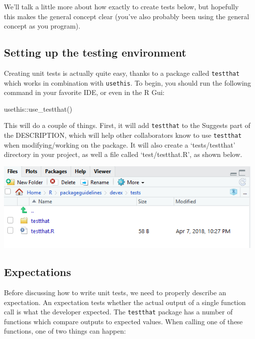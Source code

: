 \documentclass[
]{book}
\newenvironment{Shaded}{\begin{snugshade}}{\end{snugshade}}
\newcommand{\FunctionTok}[1]{\textcolor[rgb]{0.00,0.00,0.00}{#1}}
\newcommand{\NormalTok}[1]{#1}
\newcommand{\SpecialCharTok}[1]{\textcolor[rgb]{0.00,0.00,0.00}{#1}}
\begin{document}
We'll talk a little more about how exactly to create tests below, but hopefully this makes the general concept clear (you've also probably been using the general concept as you program).

\hypertarget{setting-up-the-testing-environment}{%
\subsection{Setting up the testing environment}\label{setting-up-the-testing-environment}}

Creating unit tests is actually quite easy, thanks to a package called \texttt{testthat} which works in combination with \texttt{usethis}. To begin, you should run the following command in your favorite IDE, or even in the R Gui:

\begin{Shaded}
\begin{Highlighting}[]
\NormalTok{usethis}\SpecialCharTok{::}\FunctionTok{use\_testthat}\NormalTok{()}
\end{Highlighting}
\end{Shaded}

This will do a couple of things. First, it will add \texttt{testthat} to the Suggests part of the DESCRIPTION, which will help other collaborators know to use \texttt{testthat} when modifying/working on the package. It will also create a `tests/testthat' directory in your project, as well a file called `test/testthat.R', as shown below.

\includegraphics{images/testSS/devtoolstestthat.PNG}

\hypertarget{expectations}{%
\subsection{Expectations}\label{expectations}}

Before discussing how to write unit tests, we need to properly describe an expectation. An expectation tests whether the actual output of a single function call is what the developer expected. The \texttt{testthat} package has a number of functions which compare outputs to expected values. When calling one of these functions, one of two things can happen:
\end{document}
